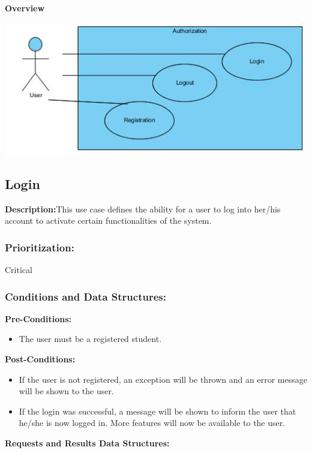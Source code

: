 \documentclass[a4paper,11pt]{article}
\begin{document}

\textbf{Overview}\\
\begin{center}
\includegraphics[width=1\linewidth]{./Images/OverviewDiagrams/AuthorizationOverview.jpg}\\
\end{center}
\subsection{Login}
\textbf{Description:}This use case defines the ability for a user to log into her/his account to activate certain functionalities of the system.
\subsubsection{Prioritization:}Critical
\subsubsection{Conditions and Data Structures:}
\textbf{Pre-Conditions:}
\begin{itemize}
	\item The user must be a registered student.
\end{itemize}
\textbf{Post-Conditions:}
\begin{itemize}
	\item If the user is not registered, an exception will be thrown and an error message will be shown to the user.
	\item If the login was successful, a message will be shown to inform the user that he/she is now logged in. More features will now be available to the user.
\end{itemize}
\textbf{Requests and Results Data Structures:}
\end{document}
